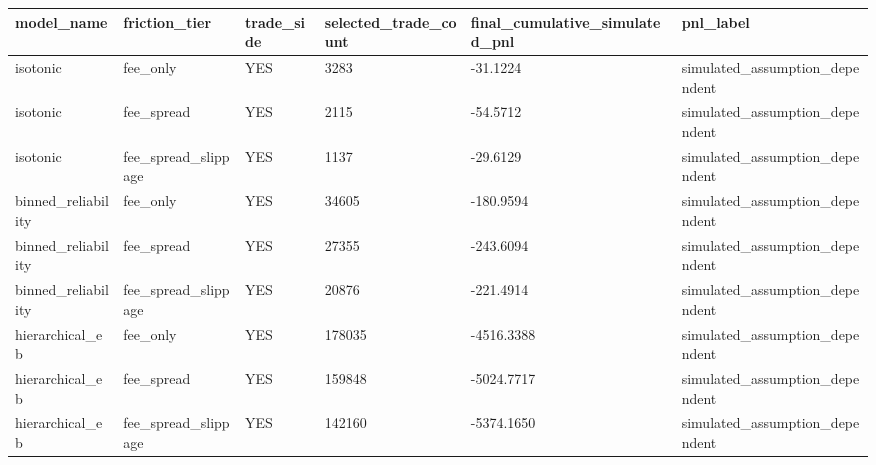 \begin{tabular}{llllll}
\toprule
model\_name & friction\_tier & trade\_side & selected\_trade\_count & final\_cumulative\_simulated\_pnl & pnl\_label \\
\midrule
isotonic & fee\_only & YES & 3283 & -31.1224 & simulated\_assumption\_dependent \\
isotonic & fee\_spread & YES & 2115 & -54.5712 & simulated\_assumption\_dependent \\
isotonic & fee\_spread\_slippage & YES & 1137 & -29.6129 & simulated\_assumption\_dependent \\
binned\_reliability & fee\_only & YES & 34605 & -180.9594 & simulated\_assumption\_dependent \\
binned\_reliability & fee\_spread & YES & 27355 & -243.6094 & simulated\_assumption\_dependent \\
binned\_reliability & fee\_spread\_slippage & YES & 20876 & -221.4914 & simulated\_assumption\_dependent \\
hierarchical\_eb & fee\_only & YES & 178035 & -4516.3388 & simulated\_assumption\_dependent \\
hierarchical\_eb & fee\_spread & YES & 159848 & -5024.7717 & simulated\_assumption\_dependent \\
hierarchical\_eb & fee\_spread\_slippage & YES & 142160 & -5374.1650 & simulated\_assumption\_dependent \\
\bottomrule
\end{tabular}

